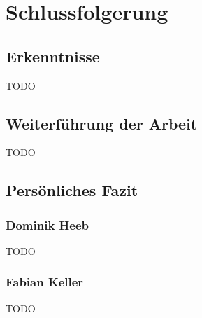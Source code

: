 
\chapter{Schlussfolgerung}
\section{Erkenntnisse}
\begin{flushleft}
TODO
\end{flushleft}
\section{Weiterführung der Arbeit}
\begin{flushleft}
TODO
\end{flushleft}
\section{Persönliches Fazit}
\subsection{Dominik Heeb}
\begin{flushleft}
TODO
\end{flushleft}
\subsection{Fabian Keller}
\begin{flushleft}
TODO
\end{flushleft}